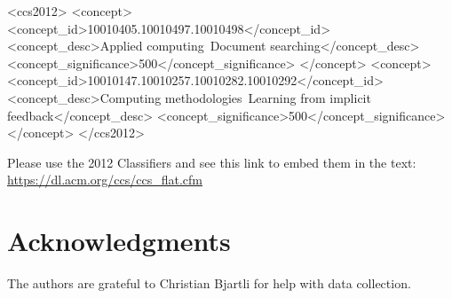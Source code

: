 \documentclass{sigchi}
\begin{document}




\begin{CCSXML}
<ccs2012>
   <concept>
       <concept_id>10010405.10010497.10010498</concept_id>
       <concept_desc>Applied computing~Document searching</concept_desc>
       <concept_significance>500</concept_significance>
       </concept>
   <concept>
       <concept_id>10010147.10010257.10010282.10010292</concept_id>
       <concept_desc>Computing methodologies~Learning from implicit feedback</concept_desc>
       <concept_significance>500</concept_significance>
       </concept>
 </ccs2012>
\end{CCSXML}



\printccsdesc
Please use the 2012 Classifiers and see this link to embed them in the text: \url{https://dl.acm.org/ccs/ccs_flat.cfm}


\maketitle






\section*{Acknowledgments}
The authors are grateful to Christian Bjartli for help with data collection.
\balance{}

\newcommand{\newblock}{}
%
%
\printbibliography
\end{document}
